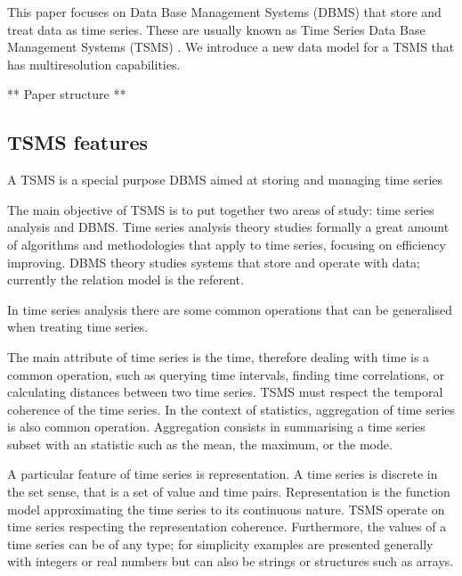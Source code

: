 
This paper focuses on Data Base Management Systems (DBMS) that store
and treat data as time series. These are usually known as Time Series
Data Base Management Systems (TSMS) \cite{dreyer94}.  We introduce a
new data model for a TSMS that has multiresolution capabilities.


** Paper structure **\todo{}



\subsection{TSMS features}

A TSMS is a special purpose DBMS aimed at storing and managing time
series

The main objective of TSMS is to put together two areas of study: time
series analysis and DBMS.  Time series analysis theory studies
formally a great amount of algorithms and methodologies that apply to
time series, focusing on efficiency improving. DBMS theory studies
systems that store and operate with data; currently the relation model
\cite{date:introduction} is the referent.

In time series analysis there are some common operations that can be
generalised when treating time series.

The main attribute of time series is the time, therefore dealing with
time is a common operation, such as querying time intervals, finding
time correlations, or calculating distances between two time
series. TSMS must respect the temporal coherence of the time series.
In the context of statistics, aggregation of time series is also
common operation. Aggregation consists in summarising a time series
subset with an statistic such as the mean, the maximum, or the mode.

A particular feature of time series is representation. A time series
is discrete in the set sense, that is a set of value and time
pairs. Representation is the function model approximating the time
series to its continuous nature. TSMS operate on time series
respecting the representation coherence. Furthermore, the values of a
time series can be of any type; for simplicity examples are presented
generally with integers or real numbers but can also be strings or
structures such as arrays.





